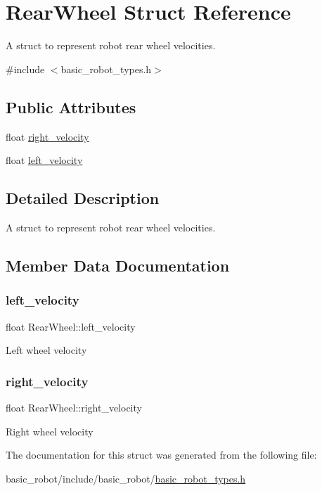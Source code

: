 \hypertarget{structRearWheel}{}\section{Rear\+Wheel Struct Reference}
\label{structRearWheel}


A struct to represent robot rear wheel velocities.  




{\ttfamily \#include $<$basic\+\_\+robot\+\_\+types.\+h$>$}

\subsection*{Public Attributes}
\begin{DoxyCompactItemize}
\item 
float \hyperlink{structRearWheel_aabf04361e481b8648ffc1cb902bf6bf2}{right\+\_\+velocity}
\item 
float \hyperlink{structRearWheel_a90fdc87b182862b8ff32be3575010a66}{left\+\_\+velocity}
\end{DoxyCompactItemize}


\subsection{Detailed Description}
A struct to represent robot rear wheel velocities. 

\subsection{Member Data Documentation}
\mbox{\label{structRearWheel_a90fdc87b182862b8ff32be3575010a66}} 
\subsubsection{\texorpdfstring{left\+\_\+velocity}{left\_velocity}}
{\footnotesize\ttfamily float Rear\+Wheel\+::left\+\_\+velocity}

Left wheel velocity \mbox{\label{structRearWheel_aabf04361e481b8648ffc1cb902bf6bf2}} 
\subsubsection{\texorpdfstring{right\+\_\+velocity}{right\_velocity}}
{\footnotesize\ttfamily float Rear\+Wheel\+::right\+\_\+velocity}

Right wheel velocity 

The documentation for this struct was generated from the following file\+:\begin{DoxyCompactItemize}
\item 
basic\+\_\+robot/include/basic\+\_\+robot/\hyperlink{basic__robot__types_8h}{basic\+\_\+robot\+\_\+types.\+h}\end{DoxyCompactItemize}

